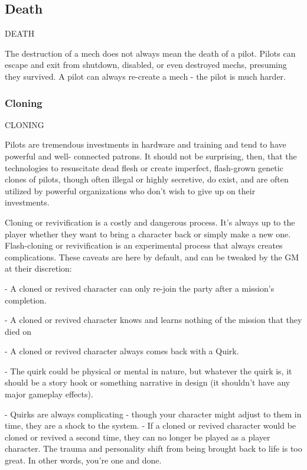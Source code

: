 \subsection{Death}
  DEATH

The destruction of a mech does not always mean the death of a pilot. Pilots can escape and exit
from shutdown, disabled, or even destroyed mechs, presuming they survived. A pilot can always
re-create a mech - the pilot is much harder.

\subsubsection{Cloning}
                                                  CLONING

Pilots are tremendous investments in hardware and training and tend to have powerful and well-
connected patrons. It should not be surprising, then, that the technologies to resuscitate dead
flesh or create imperfect, flash-grown genetic clones of pilots, though often illegal or highly
secretive, do exist, and are often utilized by powerful organizations who don’t wish to give up on
their investments.


Cloning or revivification is a costly and dangerous process. It’s always up to the player whether
they want to bring a character back or simply make a new one. Flash-cloning or revivification
is an experimental process that always creates complications. These caveats are here by
default, and can be tweaked by the GM at their discretion:


    -    A cloned or revived character can only re-join the party after a mission’s completion.

    -    A cloned or revived character knows and learns nothing of the mission that they died on

    -    A cloned or revived character always comes back with a Quirk.

             -   The quirk could be physical or mental in nature, but whatever the quirk is, it
                 should be a story hook or something narrative in design (it shouldn’t have any
                 major gameplay effects).

             -   Quirks are always complicating - though your character might adjust to them in
                 time, they are a shock to the system.
    -    If a cloned or revived character would be cloned or revived a second time, they can no
         longer be played as a player character. The trauma and personality shift from being
         brought back to life is too great. In other words, you’re one and done.


